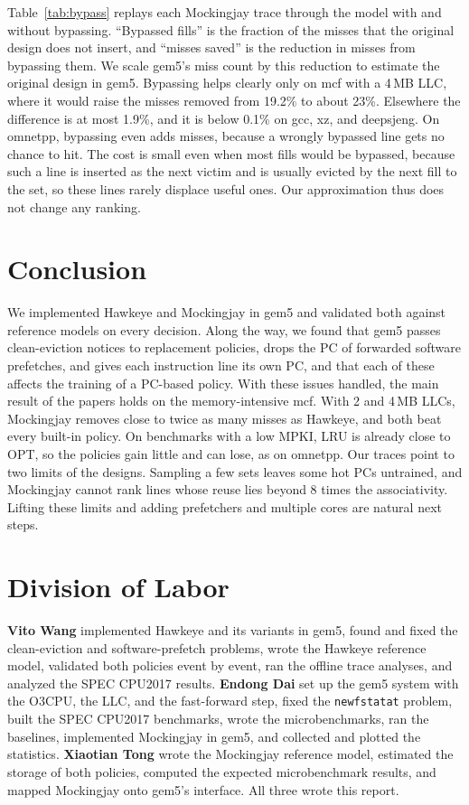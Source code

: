 \documentclass[11pt,conference]{IEEEtran}
\begin{document}
Table~\ref{tab:bypass} replays each Mockingjay trace through the model with
and without bypassing. ``Bypassed fills'' is the fraction of the misses that the
original design does not insert, and ``misses saved'' is the reduction in
misses from bypassing them. We scale gem5's miss count by this reduction to
estimate the original design in gem5. Bypassing helps clearly only on mcf with
a 4\,MB LLC, where it would raise the misses removed from 19.2\% to about
23\%. Elsewhere the difference is at most 1.9\%, and it is below 0.1\% on gcc,
xz, and deepsjeng. On omnetpp, bypassing even adds misses, because a wrongly
bypassed line gets no chance to hit. The cost is small even when most fills
would be bypassed, because such a line is inserted as the next victim and is
usually evicted by the next fill to the set, so these lines rarely displace
useful ones. Our approximation thus does not change any ranking.

\section{Conclusion}

We implemented Hawkeye and Mockingjay in gem5 and validated both against
reference models on every decision. Along the way, we found that gem5 passes
clean-eviction notices to replacement policies, drops the PC of forwarded
software prefetches, and gives each instruction line its own PC, and that each
of these affects the training of a PC-based policy. With these issues
handled, the main result of the papers holds on the memory-intensive mcf. With
2 and 4\,MB LLCs, Mockingjay removes close to twice as many misses as Hawkeye,
and both beat every built-in policy. On benchmarks with a low MPKI, LRU is
already close to OPT, so the policies gain little and can lose, as on omnetpp. Our traces point to two limits of the
designs. Sampling a few sets leaves some hot PCs untrained, and Mockingjay
cannot rank lines whose reuse lies beyond 8 times the associativity. Lifting
these limits and adding prefetchers and multiple cores are natural next steps.

\section*{Division of Labor}

\textbf{Vito Wang} implemented Hawkeye and its variants in gem5, found and fixed
the clean-eviction and software-prefetch problems, wrote the Hawkeye reference
model, validated both policies event by event, ran the offline trace analyses,
and analyzed the SPEC CPU2017 results. \textbf{Endong Dai} set up the gem5
system with the O3CPU, the LLC, and the fast-forward step, fixed the
\texttt{newfstatat} problem, built the SPEC CPU2017 benchmarks, wrote the
microbenchmarks, ran the baselines, implemented Mockingjay in gem5, and
collected and plotted the statistics. \textbf{Xiaotian Tong} wrote the
Mockingjay reference model, estimated the storage of both policies, computed
the expected microbenchmark results, and mapped Mockingjay onto gem5's
interface. All three wrote this report.
\end{document}
